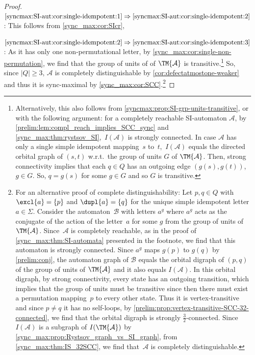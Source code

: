 \begin{proof}
	$\ref{syncmax:SI-aut:cor:single-idempotent:1} \Rightarrow \ref{syncmax:SI-aut:cor:single-idempotent:2}$:
	This follows from \cref{sync_max:cor:SIcr}, 
	
	$\ref{syncmax:SI-aut:cor:single-idempotent:2} \Rightarrow \ref{syncmax:SI-aut:cor:single-idempotent:3}$:	
	As it has only one non-permutational letter, by \cref{sync_max:cor:single-non-permutation}, 
	we find that the group of units of of $\TM{\mathcal A}$  is transitive.\footnote{Alternatively,
		this also follows from \cref{syncmax:prop:SI-grp-units-transitive},
		or with the following argument: for a completely reachable SI-automaton $\mathcal A$, by \cref{prelim:lem:compl_reach_implies_SCC_sync} and \cref{sync_max:thm:rystsov_SI},~$I(\mathcal A)$ 
		is strongly connected. In case $\mathcal A$ has only a single simple idempotent mapping~$s$ to~$t$,~$I(\mathcal A)$ equals
		the directed orbital graph of $(s,t)$ w.r.t.~the group of units $G$ of $\TM{\mathcal A}$.
		Then, strong connectivity implies
		that each $q \in Q$ has an outgoing edge $(g(s), g(t))$, $g \in G$.
		So, $q = g(s)$ for some $g \in G$ and so $G$ is transitive.}
	So, since $|Q| \ge 3$,
	$\mathcal A$ is completely distinguishable by \cref{cor:defectatmostone-weaker}
	and thus it is sync-maximal by \cref{sync_max:cor:SCC}.\footnote{For an alternative proof of complete distinguishability:
		Let $p, q \in Q$
		with $\excl{a} = \{p\}$ and $\dupl{a} = \{q\}$
		for the unique simple idempotent letter $a \in \Sigma$.
		Consider the automaton~$\mathcal B$
		with letters $a^g$
		where $a^g$ acts as the conjugate of the action of the letter~$a$
		for some $g$ from the group of units of $\TM{\mathcal A}$.
		Since~$\mathcal A$ is completely reachable, as in the proof of \cref{sync_max:thm:SI-automata}
		presented in the footnote, we find that this automaton is strongly connected.
		Since $a^g$ maps $g(p)$ to $g(q)$ by \cref{prelim:conj},
		the automaton graph of $\mathcal B$ equals the orbital digraph
		of $(p,q)$ of the group of units of $\TM{\mathcal A}$
		and it also equals $I(\mathcal A)$.
		In this orbital digraph, by strong connectivity,
		every state has an outgoing transition, which
		implies that the group of units must be transitive
		since then there must exist a permutation mapping~$p$
		to every other state.
		Thus it is vertex-transitive and since $p \ne q$ it has no self-loops, by \cref{prelim:prop:vertex-transitive-SCC-32-connected},
		we find that the orbital digraph is strongly $\frac{3}{2}$-connected.
		Since $I(\mathcal A)$ is a subgraph of $I(\TM{\mathcal A})$
		by \cref{sync_max:prop:Rystsov_graph_vs_SI_graph},
		from \cref{sync_max:thm:IS_32SCC}, 
		we find that~$\mathcal A$
		is completely distinguishable.}	
	

\end{proof}
